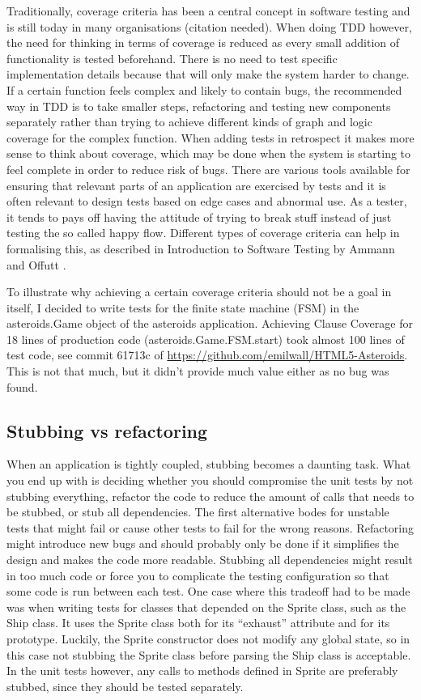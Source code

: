 \documentclass[11pt]{article}
\begin{document}
Traditionally, coverage criteria has been a central concept in software testing and is still today in many organisations (citation needed). When doing TDD however, the need for thinking in terms of coverage is reduced as every small addition of functionality is tested beforehand. There is no need to test specific implementation details because that will only make the system harder to change. If a certain function feels complex and likely to contain bugs, the recommended way in TDD is to take smaller steps, refactoring and testing new components separately rather than trying to achieve different kinds of graph and logic coverage for the complex function. When adding tests in retrospect it makes more sense to think about coverage, which may be done when the system is starting to feel complete in order to reduce risk of bugs. There are various tools available for ensuring that relevant parts of an application are exercised by tests and it is often relevant to design tests based on edge cases and abnormal use. As a tester, it tends to pays off having the attitude of trying to break stuff instead of just testing the so called happy flow. Different types of coverage criteria can help in formalising this, as described in Introduction to Software Testing by Ammann and Offutt \cite{AmmannOffutt}.

To illustrate why achieving a certain coverage criteria should not be a goal in itself, I decided to write tests for the finite state machine (FSM) in the asteroids.Game object of the asteroids application. Achieving Clause Coverage\cite[p.~106]{AmmannOffutt} for 18 lines of production code (asteroids.Game.FSM.start) took almost 100 lines of test code, see commit 61713c of \url{https://github.com/emilwall/HTML5-Asteroids}. This is not that much, but it didn't provide much value either as no bug was found.

\subsection{Stubbing vs refactoring}

When an application is tightly coupled, stubbing becomes a daunting task. What you end up with is deciding whether you should compromise the unit tests by not stubbing everything, refactor the code to reduce the amount of calls that needs to be stubbed, or stub all dependencies. The first alternative bodes for unstable tests that might fail or cause other tests to fail for the wrong reasons. Refactoring might introduce new bugs and should probably only be done if it simplifies the design and makes the code more readable. Stubbing all dependencies might result in too much code or force you to complicate the testing configuration so that some code is run between each test. One case where this tradeoff had to be made was when writing tests for classes that depended on the Sprite class, such as the Ship class. It uses the Sprite class both for its ``exhaust'' attribute and for its prototype. Luckily, the Sprite constructor does not modify any global state, so in this case not stubbing the Sprite class before parsing the Ship class is acceptable. In the unit tests however, any calls to methods defined in Sprite are preferably stubbed, since they should be tested separately.
\end{document}
